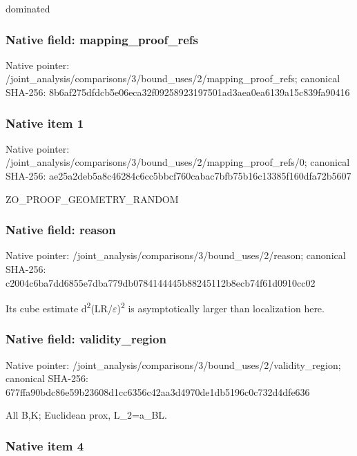 \documentclass[10pt,a4paper]{article}
\begin{document}
dominated


\subsubsection{Native field: mapping\_proof\_refs}


Native pointer: /joint\_analysis/comparis\allowbreak{}ons/3/bound\_uses/2/mappi\allowbreak{}ng\_proof\_refs; canonical SHA-256: 8b6af275dfdcb5e06eca32f0\allowbreak{}9258923197501ad3aea0ea61\allowbreak{}39a15c839fa90416



\subsubsection{Native item 1}


Native pointer: /joint\_analysis/comparis\allowbreak{}ons/3/bound\_uses/2/mappi\allowbreak{}ng\_proof\_refs/0; canonical SHA-256: ae25a2deb5a8c46284c6cc5b\allowbreak{}bcf760cabac7bfb75b16c133\allowbreak{}85f160dfa72b5607


ZO\_PROOF\_GEOMETRY\_RANDOM


\subsubsection{Native field: reason}


Native pointer: /joint\_analysis/comparis\allowbreak{}ons/3/bound\_uses/2/reaso\allowbreak{}n; canonical SHA-256: c2004c6ba7dd6855e7dba779\allowbreak{}db0784144445b88245112b8e\allowbreak{}cb74f61d0910cc02


Its cube estimate d\textsuperscript{2}(LR/\ensuremath{\varepsilon})\textsuperscript{2} is asymptotically larger than localization here.


\subsubsection{Native field: validity\_region}


Native pointer: /joint\_analysis/comparis\allowbreak{}ons/3/bound\_uses/2/valid\allowbreak{}ity\_region; canonical SHA-256: 677ffa90bdc86e59b23608d1\allowbreak{}cc6356c42aa3d4970de1db51\allowbreak{}96c0c732d4dfe636


All B,K; Euclidean prox, L\_2=a\_BL.


\subsubsection{Native item 4}
\end{document}
